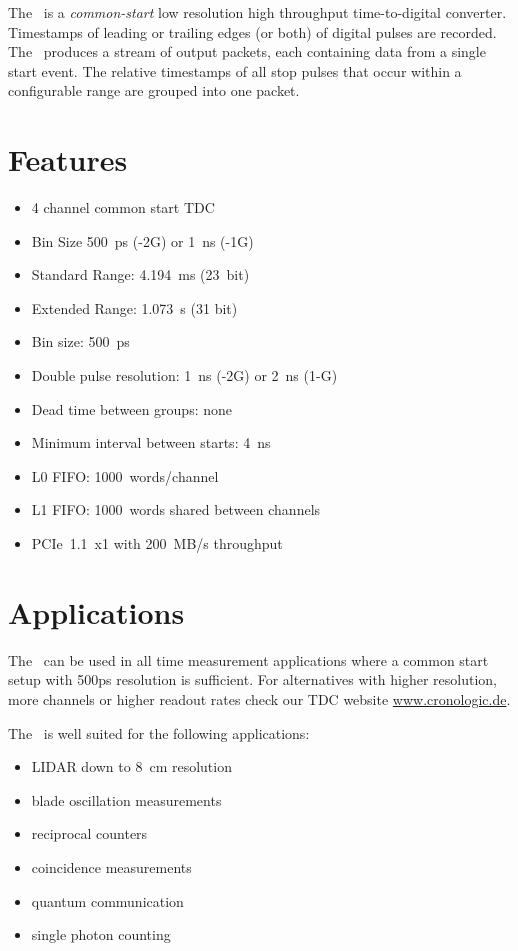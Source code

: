 The \deviceName\ is a \emph{common-start} low resolution high throughput time-to-digital converter. 
Timestamps of leading or trailing edges (or both) of digital pulses are recorded. 
The \deviceName\ produces a stream of output packets, each containing data from a single start event. 
The relative timestamps of all stop pulses that occur within a configurable range are grouped into one packet.

\section{Features}
	\begin{itemize}
		\item 4 channel common start TDC
		\item Bin Size 500~ps (-2G) or 1~ns (-1G)
		\item Standard Range: 4.194~ms (23~bit)
		\item Extended Range: 1.073~s (31 bit)
		\item Bin size: 500~ps
		\item Double pulse resolution: 1~ns (-2G) or 2~ns (1-G)
		\item Dead time between groups: none
		\item Minimum interval between starts: 4~ns
		\item L0 FIFO: 1000~words/channel
		\item L1 FIFO: 1000~words shared between channels
		\item PCIe~1.1~x1 with 200~MB/s throughput
	\end{itemize} 

\section{Applications}
	The \deviceName\  can be used in all time measurement applications where a common start setup with 500ps resolution is sufficient. 
	For alternatives with higher resolution, more channels or higher readout rates check our TDC website \href{https://www.cronologic.de/produkte/products-overview#tdcdata}{www.cronologic.de}.

	The \deviceName\ is well suited for the following applications:
	\begin{itemize}
		\item LIDAR down to 8~cm resolution
		\item blade oscillation measurements
		\item reciprocal counters
		\item coincidence measurements
		\item quantum communication
		\item single photon counting
	\end{itemize} 
